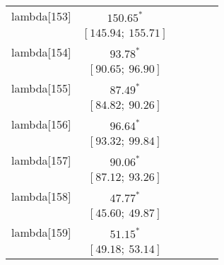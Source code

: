 \begin{table}
\begin{center}
\begin{tabular}{l c c c c c }
lambda[153] & $150.65^{*}$                     &                           &                           &                         &                         \\
            & $[145.94;\ 155.71]$              &                           &                           &                         &                         \\
lambda[154] & $93.78^{*}$                      &                           &                           &                         &                         \\
            & $[90.65;\ 96.90]$                &                           &                           &                         &                         \\
lambda[155] & $87.49^{*}$                      &                           &                           &                         &                         \\
            & $[84.82;\ 90.26]$                &                           &                           &                         &                         \\
lambda[156] & $96.64^{*}$                      &                           &                           &                         &                         \\
            & $[93.32;\ 99.84]$                &                           &                           &                         &                         \\
lambda[157] & $90.06^{*}$                      &                           &                           &                         &                         \\
            & $[87.12;\ 93.26]$                &                           &                           &                         &                         \\
lambda[158] & $47.77^{*}$                      &                           &                           &                         &                         \\
            & $[45.60;\ 49.87]$                &                           &                           &                         &                         \\
lambda[159] & $51.15^{*}$                      &                           &                           &                         &                         \\
            & $[49.18;\ 53.14]$                &                           &                           &                         &                         \\

\end{tabular}
\end{center}
\end{table}
